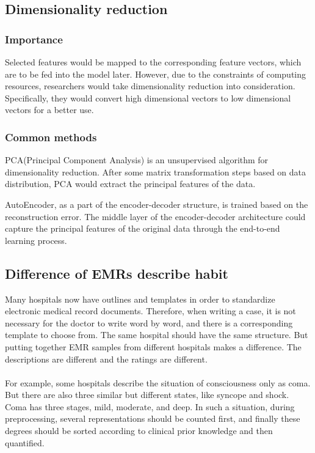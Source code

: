 \subsection{Dimensionality reduction} %
\subsubsection{Importance}
Selected features would be mapped to the corresponding feature vectors, which are to be fed into the model later. However, due to the constraints of computing resources, researchers would take dimensionality reduction into consideration. Specifically, they would convert high dimensional vectors to low dimensional vectors for a better use.

\subsubsection{Common methods}
 PCA(Principal Component Analysis) is an unsupervised algorithm for dimensionality reduction. After some matrix transformation steps based on data distribution, PCA would extract the principal features of the data.

 AutoEncoder, as a part of the encoder-decoder structure, is trained based on the reconstruction error. The middle layer of the encoder-decoder architecture could capture the principal features of the original data through the end-to-end learning process.

\subsection{Difference of EMRs describe habit}%
Many hospitals now have outlines and templates in order to standardize electronic medical record documents. Therefore, when writing a case, it is not necessary for the doctor to write word by word, and there is a corresponding template to choose from. The same hospital should have the same structure. But putting together EMR samples from different hospitals makes a difference. The descriptions are different and the ratings are different.\\
\\For example, some hospitals describe the situation of consciousness only as coma. But there are also three similar but different states, like syncope and shock.
\\Coma has three stages, mild, moderate, and deep.
In such a situation, during preprocessing, several representations should be counted first, and finally these degrees should be sorted according to clinical prior knowledge and then quantified.

